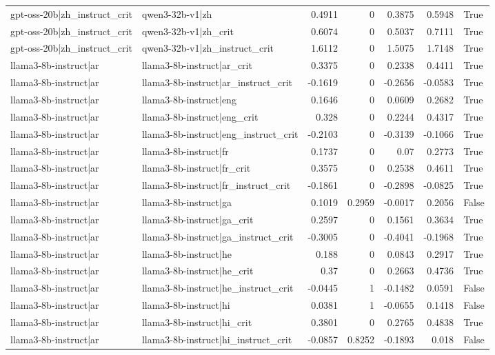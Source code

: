 \begin{table}
\begin{tabular}{l l r r r r l}
gpt-oss-20b|zh_instruct_crit & qwen3-32b-v1|zh & 0.4911 & 0 & 0.3875 & 0.5948 & True \\
gpt-oss-20b|zh_instruct_crit & qwen3-32b-v1|zh_crit & 0.6074 & 0 & 0.5037 & 0.7111 & True \\
gpt-oss-20b|zh_instruct_crit & qwen3-32b-v1|zh_instruct_crit & 1.6112 & 0 & 1.5075 & 1.7148 & True \\
llama3-8b-instruct|ar & llama3-8b-instruct|ar_crit & 0.3375 & 0 & 0.2338 & 0.4411 & True \\
llama3-8b-instruct|ar & llama3-8b-instruct|ar_instruct_crit & -0.1619 & 0 & -0.2656 & -0.0583 & True \\
llama3-8b-instruct|ar & llama3-8b-instruct|eng & 0.1646 & 0 & 0.0609 & 0.2682 & True \\
llama3-8b-instruct|ar & llama3-8b-instruct|eng_crit & 0.328 & 0 & 0.2244 & 0.4317 & True \\
llama3-8b-instruct|ar & llama3-8b-instruct|eng_instruct_crit & -0.2103 & 0 & -0.3139 & -0.1066 & True \\
llama3-8b-instruct|ar & llama3-8b-instruct|fr & 0.1737 & 0 & 0.07 & 0.2773 & True \\
llama3-8b-instruct|ar & llama3-8b-instruct|fr_crit & 0.3575 & 0 & 0.2538 & 0.4611 & True \\
llama3-8b-instruct|ar & llama3-8b-instruct|fr_instruct_crit & -0.1861 & 0 & -0.2898 & -0.0825 & True \\
llama3-8b-instruct|ar & llama3-8b-instruct|ga & 0.1019 & 0.2959 & -0.0017 & 0.2056 & False \\
llama3-8b-instruct|ar & llama3-8b-instruct|ga_crit & 0.2597 & 0 & 0.1561 & 0.3634 & True \\
llama3-8b-instruct|ar & llama3-8b-instruct|ga_instruct_crit & -0.3005 & 0 & -0.4041 & -0.1968 & True \\
llama3-8b-instruct|ar & llama3-8b-instruct|he & 0.188 & 0 & 0.0843 & 0.2917 & True \\
llama3-8b-instruct|ar & llama3-8b-instruct|he_crit & 0.37 & 0 & 0.2663 & 0.4736 & True \\
llama3-8b-instruct|ar & llama3-8b-instruct|he_instruct_crit & -0.0445 & 1 & -0.1482 & 0.0591 & False \\
llama3-8b-instruct|ar & llama3-8b-instruct|hi & 0.0381 & 1 & -0.0655 & 0.1418 & False \\
llama3-8b-instruct|ar & llama3-8b-instruct|hi_crit & 0.3801 & 0 & 0.2765 & 0.4838 & True \\
llama3-8b-instruct|ar & llama3-8b-instruct|hi_instruct_crit & -0.0857 & 0.8252 & -0.1893 & 0.018 & False \\

\end{tabular}
\end{table}
